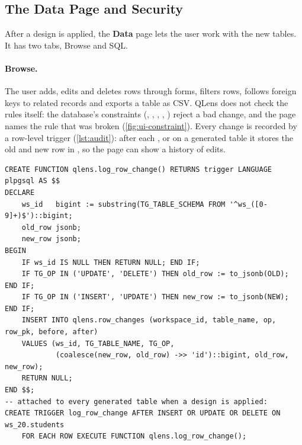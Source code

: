 \subsection{The Data Page and Security}
\label{sec:design-sandbox}

After a design is applied, the \textbf{Data} page lets the user work with the new tables. It has two
tabs, Browse and SQL.

\paragraph{Browse.} The user adds, edits and deletes rows through forms, filters rows, follows foreign
keys to related records and exports a table as CSV. QLens does not check the rules itself: the database's
constraints (, , , , ) reject a
bad change, and the page names the rule that was broken (\cref{fig:ui-constraint}). Every change is
recorded by a row-level trigger (\cref{lst:audit}): after each ,  or
 on a generated table it stores the old and new row in , so the page
can show a history of edits.

\begin{lstlisting}[float=tbp,caption={[Audit trigger]Row-level trigger function that records every change to a generated table},label={lst:audit}]
CREATE FUNCTION qlens.log_row_change() RETURNS trigger LANGUAGE plpgsql AS $$
DECLARE
    ws_id   bigint := substring(TG_TABLE_SCHEMA FROM '^ws_([0-9]+)$')::bigint;
    old_row jsonb;
    new_row jsonb;
BEGIN
    IF ws_id IS NULL THEN RETURN NULL; END IF;
    IF TG_OP IN ('UPDATE', 'DELETE') THEN old_row := to_jsonb(OLD); END IF;
    IF TG_OP IN ('INSERT', 'UPDATE') THEN new_row := to_jsonb(NEW); END IF;
    INSERT INTO qlens.row_changes (workspace_id, table_name, op, row_pk, before, after)
    VALUES (ws_id, TG_TABLE_NAME, TG_OP,
            (coalesce(new_row, old_row) ->> 'id')::bigint, old_row, new_row);
    RETURN NULL;
END $$;
-- attached to every generated table when a design is applied:
CREATE TRIGGER log_row_change AFTER INSERT OR UPDATE OR DELETE ON ws_20.students
    FOR EACH ROW EXECUTE FUNCTION qlens.log_row_change();
\end{lstlisting}



